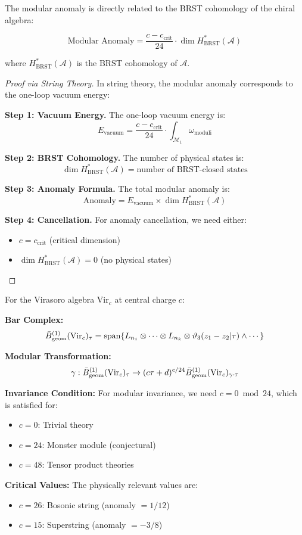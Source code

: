 \begin{theorem}\label{thm:modular-anomaly-brst}
The modular anomaly is directly related to the BRST cohomology of the chiral algebra:

$$\text{Modular Anomaly} = \frac{c - c_{\text{crit}}}{24} \cdot \dim H^*_{\text{BRST}}(\mathcal{A})$$

where $H^*_{\text{BRST}}(\mathcal{A})$ is the BRST cohomology of $\mathcal{A}$.
\end{theorem}

\begin{proof}[Proof via String Theory]
In string theory, the modular anomaly corresponds to the one-loop vacuum energy:

\textbf{Step 1: Vacuum Energy.} The one-loop vacuum energy is:
$$E_{\text{vacuum}} = \frac{c - c_{\text{crit}}}{24} \cdot \int_{\mathcal{M}_1} \omega_{\text{moduli}}$$

\textbf{Step 2: BRST Cohomology.} The number of physical states is:
$$\dim H^*_{\text{BRST}}(\mathcal{A}) = \text{number of BRST-closed states}$$

\textbf{Step 3: Anomaly Formula.} The total modular anomaly is:
$$\text{Anomaly} = E_{\text{vacuum}} \times \dim H^*_{\text{BRST}}(\mathcal{A})$$

\textbf{Step 4: Cancellation.} For anomaly cancellation, we need either:
\begin{itemize}
\item $c = c_{\text{crit}}$ (critical dimension)
\item $\dim H^*_{\text{BRST}}(\mathcal{A}) = 0$ (no physical states)
\end{itemize}
\end{proof}

\begin{example}
For the Virasoro algebra $\text{Vir}_c$ at central charge $c$:

\textbf{Bar Complex:}
$$\bar{B}_{\text{geom}}^{(1)}(\text{Vir}_c)_\tau = \text{span}\{L_{n_1} \otimes \cdots \otimes L_{n_k} \otimes \vartheta_3(z_1-z_2|\tau) \wedge \cdots\}$$

\textbf{Modular Transformation:}
$$\gamma: \bar{B}_{\text{geom}}^{(1)}(\text{Vir}_c)_\tau \to (c\tau + d)^{c/24} \bar{B}_{\text{geom}}^{(1)}(\text{Vir}_c)_{\gamma \cdot \tau}$$

\textbf{Invariance Condition:} For modular invariance, we need $c = 0 \bmod 24$, which is satisfied for:
\begin{itemize}
\item $c = 0$: Trivial theory
\item $c = 24$: Monster module (conjectural)
\item $c = 48$: Tensor product theories
\end{itemize}

\textbf{Critical Values:} The physically relevant values are:
\begin{itemize}
\item $c = 26$: Bosonic string (anomaly $= 1/12$)
\item $c = 15$: Superstring (anomaly $= -3/8$)
\end{itemize}
\end{example}

